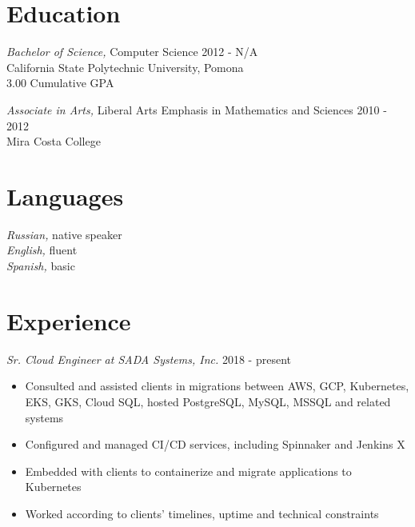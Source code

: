 \documentclass[line]{tex/res}
\begin{document}
\address{https://smaslennikov.com}
\address{Email: me@smaslennikov.com}

\begin{resume}

\section{Education}
    {\sl Bachelor of Science,} Computer Science \hfill 2012 - N/A\\
    California State Polytechnic University, Pomona \\
    3.00 Cumulative GPA

    {\sl Associate in Arts,} Liberal Arts Emphasis in Mathematics and Sciences \hfill 2010 - 2012 \\
    Mira Costa College

\section{Languages}
    {\sl Russian,} native speaker \\
    {\sl English,} fluent \\
    {\sl Spanish,} basic

\section{Experience}
    {\sl Sr. Cloud Engineer at SADA Systems, Inc.} \hfill 2018 - present
    \begin{itemize} \itemsep -2pt
        \item Consulted and assisted clients in migrations between AWS, GCP, Kubernetes, \\
            EKS, GKS, Cloud SQL, hosted PostgreSQL, MySQL, MSSQL and related systems
        \item Configured and managed CI/CD services, including Spinnaker and Jenkins X
        \item Embedded with clients to containerize and migrate applications to Kubernetes
        \item Worked according to clients' timelines, uptime and technical constraints
    \end{itemize}


\end{resume}
\end{document}
